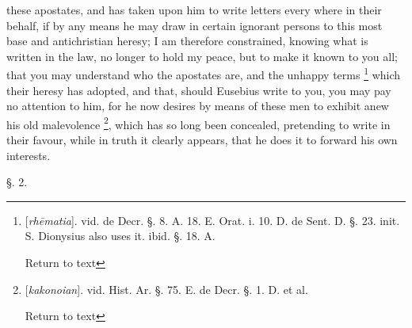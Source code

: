 these apostates, and has taken upon him to write letters every where
in their behalf, if by any means he may draw in certain ignorant
persons to this most base and antichristian heresy; I am therefore
constrained, knowing what is written in the law, no longer to hold my
peace, but to make it known to you all; that you may understand who
the apostates are, and the unhappy terms \footnote{[\emph{rh\={e}matia}]. vid. de Decr. §. 8. A. 18. E. Orat. i. 10.
D. de Sent. D. §. 23. init. S. Dionysius also uses it. ibid. §. 18.
A.

Return to text} which their heresy has adopted, and that, should Eusebius write
to you, you may pay no attention to him, for he now desires by means
of these men to exhibit anew his old malevolence \footnote{[\emph{kakonoian}]. vid. Hist. Ar. §. 75. E. de Decr. §. 1. D. et
al.

Return to text}, which has so long been concealed, pretending to write in their
favour, while in truth it clearly appears, that he does it to forward
his own interests.

§. 2.

